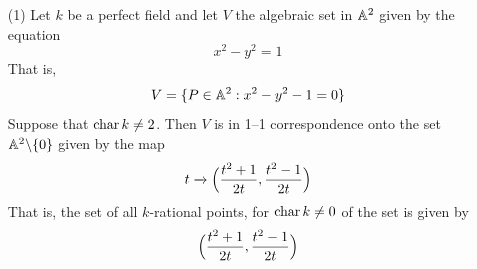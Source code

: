 \begin{example}\label{example_1.1}
    \begin{enumerate}
        \item[(1)] Let $k$ be a perfect field and let $V$ the algebraic set in
            $\mathbb{A}^2$ given by the equation
            \begin{equation*}
                x^2-y^2=1
            \end{equation*}
            That is,
            \begin{equation*}
                V=\{P \in \mathbb{A}^2 : x^2-y^2-1=0\}
            \end{equation*}
            Suppose that $\operatorname{char}{k} \neq 2$. Then $V$ is in 1--1 correspondence
            onto the set $\mathbb{A}^2 \backslash \{0\}$ given by the map
            \begin{equation*}
                t \xrightarrow{} \Big{(} \frac{t^2+1}{2t},\frac{t^2-1}{2t} \Big{)}
            \end{equation*}
            That is, the set of all $k$-rational points, for  $\operatorname{char}{k} \neq 0$
            of the set is given by
            \begin{equation*}
                \Big{(} \frac{t^2+1}{2t},\frac{t^2-1}{2t} \Big{)}
            \end{equation*}


\end{enumerate}
\end{example}
